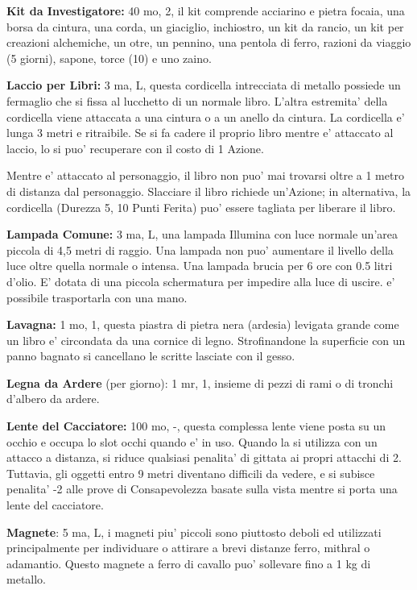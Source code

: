 \documentclass[a4paper,11pt,twoside,openany]{book}
\begin{document}
{\textbf{Kit da Investigatore:} 40 mo, 2, il kit comprende acciarino e pietra focaia, una borsa da cin­tura, una corda, un giaciglio, inchiostro, un kit da rancio, un kit per creazioni alchemiche, un otre, un pennino, una pentola di ferro, razioni da viaggio (5 giorni), sapone, torce (10) e uno zaino.

\textbf{Laccio per Libri:} 3 ma, L, questa cordicella intrecciata di metallo possiede un fermaglio che si fissa al lucchetto di un normale libro. L'altra estremita' della cordicella viene attaccata a una cintura o a un anello da cintura. La cordicella e' lunga 3 metri e ritraibile. Se si fa cadere il proprio libro mentre e' attaccato al laccio, lo si puo' recuperare con il costo di 1 Azione.

Mentre e' attaccato al personaggio, il libro non puo' mai trovarsi oltre a 1 metro di distanza dal personaggio. Slacciare il libro richiede un'Azione; in alternativa, la cordicella (Durezza 5, 10 Punti Ferita) puo' essere tagliata per liberare il libro.

\textbf{Lampada Comune:} 3 ma, L, una lampada Illumina con luce normale un'area piccola di 4,5 metri di raggio. Una lampada non puo' aumentare il livello della luce oltre quella normale o intensa. Una lampada brucia per 6 ore con 0.5 litri d'olio. E' dotata di una piccola schermatura per impedire alla luce di uscire. e' possibile trasportarla con una mano.

\textbf{Lavagna:} 1 mo, 1, questa piastra di pietra nera (ardesia) levigata grande come un libro e' circondata da una cornice di legno. Strofinandone la superficie con un panno bagnato si cancellano le scritte lasciate con il gesso.

\textbf{Legna da Ardere} (per giorno): 1 mr, 1, insieme di pezzi di rami o di tronchi d'albero da ardere.

\textbf{Lente del Cacciatore:} 100 mo, -, questa complessa lente viene posta su un occhio e occupa lo slot occhi quando e' in uso. Quando la si utilizza con un attacco a distanza, si riduce qualsiasi penalita' di gittata ai propri attacchi di 2. Tuttavia, gli oggetti entro 9 metri diventano difficili da vedere, e si subisce penalita' -2 alle prove di Consapevolezza basate sulla vista mentre si porta una lente del cacciatore.

\textbf{Magnete}: 5 ma, L, i magneti piu' piccoli sono piuttosto deboli ed utilizzati principalmente per individuare o attirare a brevi distanze ferro, mithral o adamantio. Questo magnete a ferro di cavallo puo' sollevare fino a 1 kg di metallo. 

}
\end{document}
